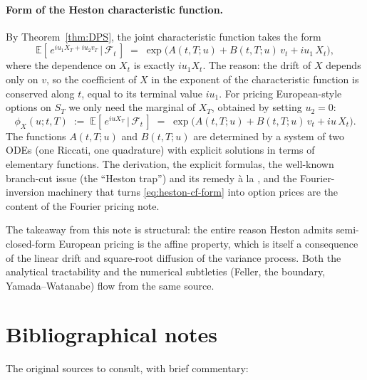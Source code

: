 \documentclass[11pt]{article}
\theoremstyle{plain}
\theoremstyle{definition}
\theoremstyle{remark}
\begin{document}
\paragraph{Form of the Heston characteristic function.}
By Theorem~\ref{thm:DPS}, the joint characteristic function takes the form
\[
    \mathbb{E}\!\left[\,e^{i u_1 X_T + i u_2 v_T}\,\Big|\,\mathcal{F}_t\,\right] \;=\; \exp\!\bigl(A(t, T; u) + B(t, T; u)\,v_t + i u_1\,X_t\bigr),
\]
where the dependence on \(X_t\) is exactly \(i u_1 X_t\). The reason: the drift of \(X\) depends only on \(v\), so the coefficient of \(X\) in the exponent of the characteristic function is conserved along \(t\), equal to its terminal value \(i u_1\). For pricing European-style options on \(S_T\) we only need the marginal of \(X_T\), obtained by setting \(u_2 = 0\):
\begin{equation}
    \phi_X(u; t, T) \;:=\; \mathbb{E}\!\left[\,e^{i u X_T}\,\Big|\,\mathcal{F}_t\,\right] \;=\; \exp\!\bigl(A(t, T; u) + B(t, T; u)\,v_t + i u\,X_t\bigr).
                                                                                                                            \label{eq:heston-cf-form}
\end{equation}
The functions \(A(t, T; u)\) and \(B(t, T; u)\) are determined by a system of two ODEs (one Riccati, one quadrature) with explicit solutions in terms of elementary functions. The derivation, the explicit formulas, the well-known branch-cut issue (the ``Heston trap'') and its remedy à la \cite{AMSS2007}, and the Fourier-inversion machinery that turns \eqref{eq:heston-cf-form} into option prices are the content of the Fourier pricing note.

The takeaway from this note is structural: the entire reason Heston admits semi-closed-form European pricing is the affine property, which is itself a consequence of the linear drift and square-root diffusion of the variance process. Both the analytical tractability and the numerical subtleties (Feller, the boundary, Yamada--Watanabe) flow from the same source.

\section{Bibliographical notes}

The original sources to consult, with brief commentary:
\end{document}
